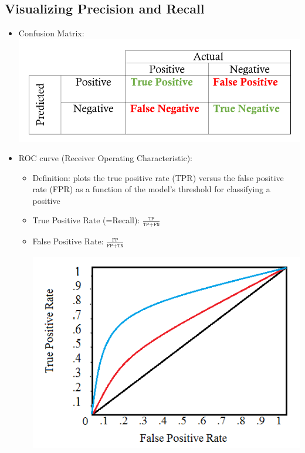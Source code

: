 \documentclass[12pt,a4paper]{article}
\begin{document}
\subsection{Visualizing Precision and Recall}
\begin{itemize}
\item Confusion Matrix:\\
\includegraphics[scale=.3]{resources/3/confusionMatrix}
\item ROC curve (Receiver Operating Characteristic):
\begin{itemize}
\item Definition: plots the true positive rate (TPR) versus the false positive rate (FPR) as a function of the model’s threshold for classifying a positive
\item True Positive Rate (=Recall): $\frac{\texttt{TP}}{\texttt{TP}+\texttt{FN}}$
\item False Positive Rate: $\frac{\texttt{FP}}{\texttt{FP}+\texttt{TN}}$
\includegraphics[scale=0.5]{resources/3/ROCcurve}

\end{itemize}
\end{itemize}
\end{document}

